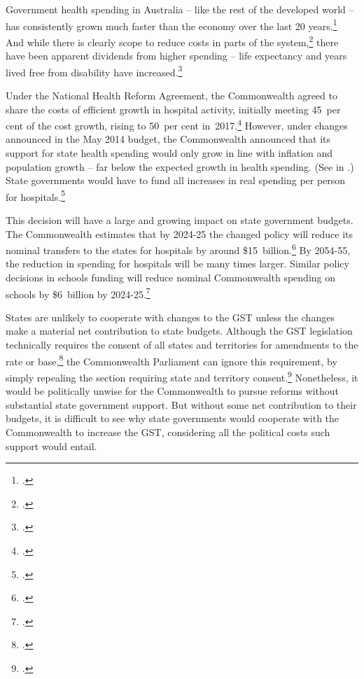 Government health spending in Australia – like the rest of the developed world – has consistently grown much faster than the economy over the last 20 years.\footcites[][25--27]{DaleyWoodWeidmannEtAl2014}[][17]{DaleyMcGannonHunter2014}  And while there is clearly scope to reduce costs in parts of the system,\footcites{DuckettBreadonGinnivanEtAl2013}{DuckettBreadonRomanesEtAl2015}  there have been apparent dividends from higher spending – life expectancy and years lived free from disability have increased.\footcite[][16]{Daley2015}  

Under the National Health Reform Agreement, the Commonwealth agreed to share the costs of efficient growth in hospital activity, initially meeting 45~per cent of the cost growth, rising to 50~per cent in~2017.\footcite[][13]{COAG2011}  However, under changes announced in the May 2014 budget, the Commonwealth announced that its support for state health spending would only grow in line with inflation and population growth – far below the expected growth in health spending. (See  in .)  State governments would have to fund all increases in real spending per person for hospitals.\footcite[][Budget Paper No.~2, p.~126]{Treasury2014-Budget-Papers-2014-15}  

This decision will have a large and growing impact on state government budgets. The Commonwealth estimates that by 2024-25 the changed policy will reduce its nominal transfers to the states for hospitals by around \$15~billion.\footcite[][115]{SenateEconomicsLegislationCommittee2014}  By 2054-55, the reduction in spending for hospitals will be many times larger.  Similar policy decisions in schools funding will reduce nominal Commonwealth spending on schools by \$6~billion by 2024-25.\footcite[][115]{SenateEconomicsLegislationCommittee2014}

States are unlikely to cooperate with changes to the GST unless the changes make a material net contribution to state budgets. Although the GST legislation technically requires the consent of all states and territories for amendments to the rate or base,\footcite[][\S11]{GST-Act-Rate-Base-1999}  the Commonwealth Parliament can ignore this requirement, by simply repealing the section requiring state and territory consent.\footcite{Twomey2003}  Nonetheless, it would be politically unwise for the Commonwealth to pursue reforms without substantial state government support. But without some net contribution to their budgets, it is difficult to see why state governments would cooperate with the Commonwealth to increase the GST, considering all the political costs such support would entail. 

